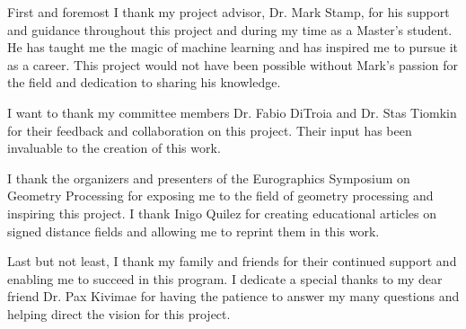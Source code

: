 
First and foremost I thank my project advisor, Dr. Mark Stamp, for his support and guidance throughout this project and during my time as a Master's student. He has taught me the magic of machine learning and has inspired me to pursue it as a career. This project would not have been possible without Mark's passion for the field and dedication to sharing his knowledge.

I want to thank my committee members Dr. Fabio DiTroia and Dr. Stas Tiomkin for their feedback and collaboration on this project. Their input has been invaluable to the creation of this work.

I thank the organizers and presenters of the Eurographics Symposium on Geometry Processing for exposing me to the field of geometry processing and inspiring this project. I thank Inigo Quilez for creating educational articles on signed distance fields and allowing me to reprint them in this work.

Last but not least, I thank my family and friends for their continued support and enabling me to succeed in this program. I dedicate a special thanks to my dear friend Dr. Pax Kivimae for having the patience to answer my many questions and helping direct the vision for this project.